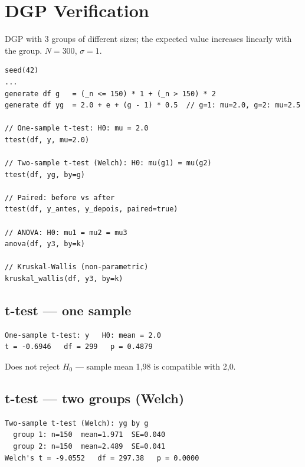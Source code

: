 \section{DGP Verification}

DGP with 3 groups of different sizes; the expected value increases linearly
with the group. $N=300$, $\sigma = 1$.

\begin{lstlisting}[caption={Hypothesis tests}]
seed(42)
...
generate df g   = (_n <= 150) * 1 + (_n > 150) * 2
generate df yg  = 2.0 + e + (g - 1) * 0.5  // g=1: mu=2.0, g=2: mu=2.5

// One-sample t-test: H0: mu = 2.0
ttest(df, y, mu=2.0)

// Two-sample t-test (Welch): H0: mu(g1) = mu(g2)
ttest(df, yg, by=g)

// Paired: before vs after
ttest(df, y_antes, y_depois, paired=true)

// ANOVA: H0: mu1 = mu2 = mu3
anova(df, y3, by=k)

// Kruskal-Wallis (non-parametric)
kruskal_wallis(df, y3, by=k)
\end{lstlisting}

\subsection*{t-test — one sample}

\begin{lstlisting}[language={}, basicstyle=\ttfamily\small, frame=none,
  numbers=none, backgroundcolor=\color{codbg}]
One-sample t-test: y   H0: mean = 2.0
t = -0.6946   df = 299   p = 0.4879
\end{lstlisting}

Does not reject $H_0$ — sample mean 1{,}98 is compatible with 2{,}0.

\subsection*{t-test — two groups (Welch)}

\begin{lstlisting}[language={}, basicstyle=\ttfamily\small, frame=none,
  numbers=none, backgroundcolor=\color{codbg}]
Two-sample t-test (Welch): yg by g
  group 1: n=150  mean=1.971  SE=0.040
  group 2: n=150  mean=2.489  SE=0.041
Welch's t = -9.0552   df = 297.38   p = 0.0000
\end{lstlisting}


